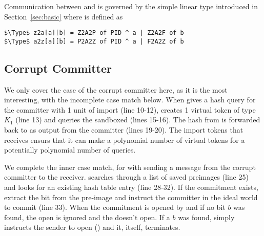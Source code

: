 Communication between \Z and \A is governed by the simple linear type \inline{comm[K][Z2A[2p][2f]} introduced in Section~\ref{sec:basic} where  is defined as 
\begin{lstlisting}[basicstyle=\footnotesize\BeraMonottFamily, mathescape]
$\Type$ z2a[a][b] = Z2A2P of PID ^ a | Z2A2F of b 
$\Type$ a2z[a][b] = P2A2Z of PID ^ a | F2A2Z of b
\end{lstlisting}

\subsection{Corrupt Committer}
We only cover the case of the corrupt committer here, as it is the most interesting, with the incomplete case match below.
When \Z gives \simcom a hash query for the committer with 1 unit of import (line 10-12), \simcom creates 1 virtual token of type $K_1$ (line 13) and queries the sandboxed \Fro (lines 15-16).  
The hash from \Fro is forwarded back to \Z as output  from the committer (lines 19-20).
The import tokens that \simcom receives ensurs that it can make a polynomial number of virtual tokens for a potentially polynomial number of queries. 

We complete the inner case match, for  with \Z sending a message from the corrupt committer to the receiver.
\simcom searches through a list of saved preimages  (line 25) and looks for an existing hash table entry (line 28-32). 
If the commitment exists, extract the bit from the pre-image and instruct the committer in the ideal world to commit (line 33).
When the commitment is opened by \Z and if no bit $b$ was found, the open is ignored and the \Fcom doesn't open.
If a $b$ was found, \simcom simply instructs the sender to open () and it, itself, terminates.  

